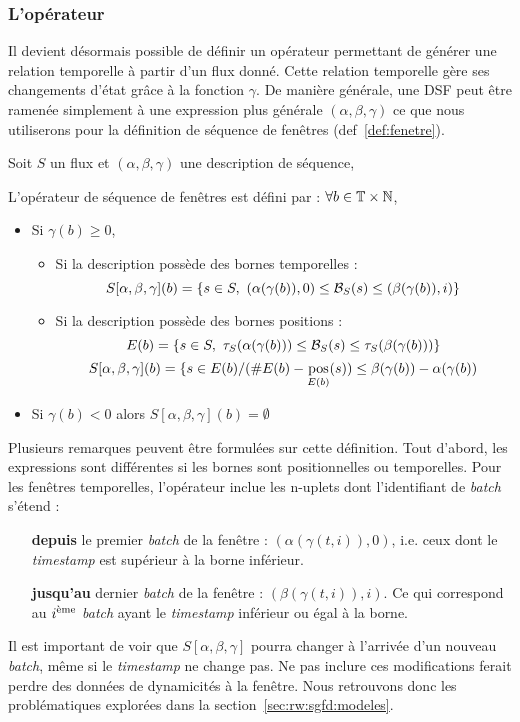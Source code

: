 \subsubsection{L'opérateur}
Il devient désormais possible de définir un opérateur permettant  de générer une relation temporelle à partir d'un flux donné. Cette relation temporelle gère ses changements d'état grâce à la fonction $\gamma$. De manière générale, une DSF peut être ramenée simplement à une expression plus générale $(\alpha,\beta,\gamma)$ ce que nous utiliserons pour la définition de séquence de fenêtres (def~\ref{def:fenetre}).
\begin{defi}\label{def:fenetre}
	Soit $S$ un flux et $(\alpha, \beta, \gamma)$ une description de séquence,
	
	L'opérateur de séquence de fenêtres est défini par : $\forall b \in \mathbb{T}\times\mathbb{N}$, 
	\begin{itemize}
		\item Si $\gamma(b) \geq 0$, 
		\begin{itemize}
			\item Si la description possède des bornes temporelles :
			$$S[\alpha,\beta,\gamma](b) = \left\{s\in S, \ (\alpha(\gamma(b)),0)\leq \BS(s) \leq (\beta(\gamma(b)),i)\right\}$$
			\item Si la description possède des bornes positions :
			$$E(b) = \left\{s\in S, \ \tau_S(\alpha(\gamma(b)))\leq \BS(s) \leq \tau_S(\beta(\gamma(b)))\right\}$$
			$$S[\alpha,\beta,\gamma](b) = \{s \in E(b) / (\#E(b) - \mathop{\mathrm{pos}}_{E(b)}(s)) \leq \beta(\gamma(b)) - \alpha(\gamma(b))$$
		\end{itemize}
		\item Si $\gamma(b) <0$ alors $S[\alpha,\beta,\gamma](b) = \emptyset$
	\end{itemize}
\end{defi}

Plusieurs remarques peuvent être formulées sur cette définition. Tout d'abord, les expressions sont différentes si les bornes sont positionnelles ou temporelles. Pour les fenêtres temporelles, l'opérateur inclue les n-uplets dont l'identifiant de \textit{batch} s'étend :
\begin{itemize}
	\item[\textbf{depuis}] le premier \textit{batch} de la fenêtre : $(\alpha(\gamma(t,i)),0)$, i.e. ceux dont le \textit{timestamp} est supérieur à la borne inférieur.
	\item[\textbf{jusqu'au}] dernier \textit{batch} de la fenêtre : $(\beta(\gamma(t,i)),i)$. Ce qui correspond au $i^{\textrm{\`{e}me}}$ \textit{batch} ayant le \textit{timestamp} inférieur ou égal à la borne.
\end{itemize}
Il est important de voir que $S[\alpha,\beta,\gamma]$ pourra changer à l'arrivée d'un nouveau \textit{batch}, même si le \textit{timestamp} ne change pas. Ne pas inclure ces modifications ferait perdre des données de dynamicités à la fenêtre. Nous retrouvons donc les problématiques explorées dans la section~\ref{sec:rw:sgfd:modeles}.

